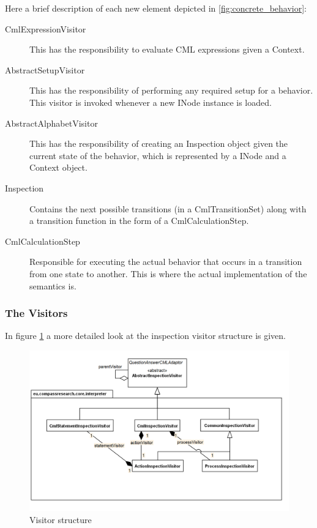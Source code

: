 \documentclass[a4paper, 10pt]{include/compassreport}   %
\begin{document}
Here a brief description of each new element depicted in \autoref{fig:concrete_behavior}:
\begin{description}
\item[CmlExpressionVisitor] This has the responsibility to evaluate
  CML expressions given a Context.

\item[AbstractSetupVisitor] This has the responsibility of performing
  any required setup for a behavior. This visitor is invoked
  whenever a new INode instance is loaded.

\item[AbstractAlphabetVisitor] This has the responsibility of creating
  an Inspection object given the current state of the behavior, which is
  represented by a INode and a Context object.

\item[Inspection] Contains the next possible transitions (in a
  CmlTransitionSet) along with a transition function in the form of a
  CmlCalculationStep.

\item[CmlCalculationStep] Responsible for executing the actual
  behavior that occurs in a transition from one state to another. This
  is where the actual implementation of the semantics is.
\end{description}

\subsubsection*{The Visitors}

In figure \ref{fig:visitors} a more detailed look at the inspection visitor structure is given.

\begin{figure}[ht!]
  \begin{center}
    \includegraphics[width=1\textwidth]{figures/Visitors}
    \caption{Visitor structure}
    \label{fig:visitors}
  \end{center}
\end{figure}
\end{document}
